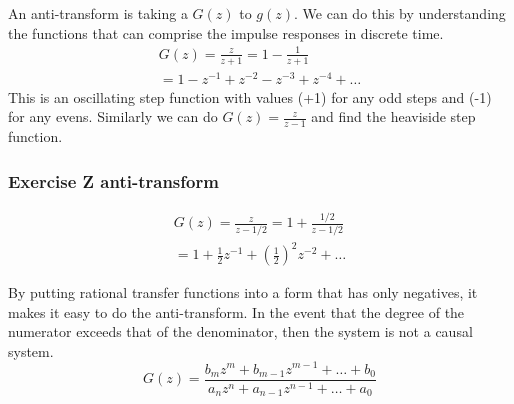 \documentclass[11pt]{article}
\begin{document}
An anti-transform is taking a $G(z)$ to $g(z)$.
We can do this by understanding the functions that can comprise the impulse responses in discrete time.
\begin{gather}
    G(z) = \frac{z}{z+1} = 1 - \frac{1}{z+1} \\
    = 1 - z^{-1} + z^{-2} - z^{-3} + z^{-4} + \dots
\end{gather}
This is an oscillating step function with values (+1) for any odd steps and (-1) for any evens.
Similarly we can do $G(z) = \frac{z}{z-1}$ and find the heaviside step function.

\subsubsection{Exercise Z anti-transform}
\begin{gather}
    G(z) = \frac{z}{z-1/2} = 1 + \frac{1/2}{z-1/2} \\
    = 1 + \frac{1}{2} z^{-1} + (\frac{1}{2})^2 z^{-2} + \dots
\end{gather}

By putting rational transfer functions into a form that has only negatives, it makes it easy to do the anti-transform.
In the event that the degree of the numerator exceeds that of the denominator, then the system is not a causal system.
\begin{equation}
    G(z) = \frac{b_m z^m + b_{m-1} z^{m-1} + \dots + b_0}{a_n z^{n} + a_{n-1} z^{n-1} + \dots + a_0}
\end{equation}



\end{document}
